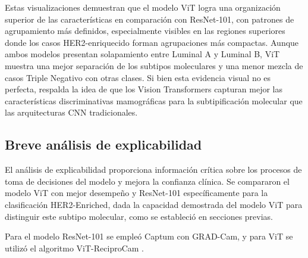 \documentclass[a4paper,10pt]{book}
\begin{document}
Estas visualizaciones demuestran que el modelo ViT logra una organización superior de las características en comparación con ResNet-101, con patrones de agrupamiento más definidos, especialmente visibles en las regiones superiores donde los casos HER2-enriquecido forman agrupaciones más compactas. Aunque ambos modelos presentan solapamiento entre Luminal A y Luminal B, ViT muestra una mejor separación de los subtipos moleculares y una menor mezcla de casos Triple Negativo con otras clases. Si bien esta evidencia visual no es perfecta, respalda la idea de que los Vision Transformers capturan mejor las características discriminativas mamográficas para la subtipificación molecular que las arquitecturas CNN tradicionales.

\subsection{Breve análisis de explicabilidad}

El análisis de explicabilidad proporciona información crítica sobre los procesos de toma de decisiones del modelo y mejora la confianza clínica. Se compararon el modelo ViT con mejor desempeño y ResNet-101 específicamente para la clasificación HER2-Enriched, dada la capacidad demostrada del modelo ViT para distinguir este subtipo molecular, como se estableció en secciones previas.

Para el modelo ResNet-101 se empleó Captum \cite{noauthor_captum_nodate, noauthor_161002391_nodate} con GRAD-Cam, y para ViT se utilizó el algoritmo ViT-ReciproCam \cite{byun_vit-reciprocam_2023}.
\end{document}
